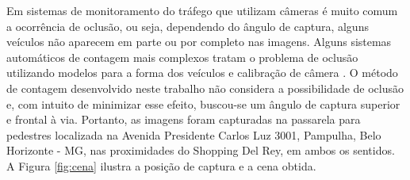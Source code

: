 Em sistemas de monitoramento do tráfego que utilizam câmeras é muito comum a ocorrência de oclusão, ou seja, dependendo do ângulo de captura, alguns veículos não aparecem em parte ou por completo nas imagens. Alguns sistemas automáticos de contagem mais complexos tratam o problema de oclusão utilizando modelos para a forma dos veículos e calibração de câmera \citep{song:2005}. O método de contagem desenvolvido neste trabalho não considera a possibilidade de oclusão e, com intuito de minimizar esse efeito, buscou-se um ângulo de captura superior e frontal à via. Portanto, as imagens foram capturadas na passarela para pedestres localizada na Avenida Presidente Carlos Luz 3001, Pampulha, Belo Horizonte - MG, nas proximidades do Shopping Del Rey, em ambos os sentidos. A Figura \ref{fig:cena} ilustra a posição de captura e a cena obtida.

